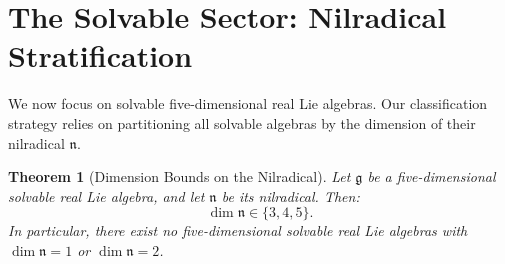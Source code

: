 \documentclass[11pt,a4paper]{article}
\newtheorem{theorem}{Theorem}[section]
\theoremstyle{definition}
\theoremstyle{remark}
\newcommand{\g}{\mathfrak{g}}
\newcommand{\n}{\mathfrak{n}}
\begin{document}
\section{The Solvable Sector: Nilradical Stratification}\label{sec:nilrad}

We now focus on solvable five-dimensional real Lie algebras. Our classification strategy relies on partitioning all solvable algebras by the dimension of their nilradical $\n$.

\begin{theorem}[Dimension Bounds on the Nilradical]\label{thm:nilrad_bounds}
Let $\g$ be a five-dimensional solvable real Lie algebra, and let $\n$ be its nilradical. Then:
\begin{equation}
    \dim \n \in \{3, 4, 5\}.
\end{equation}
In particular, there exist no five-dimensional solvable real Lie algebras with $\dim \n = 1$ or $\dim \n = 2$.
\end{theorem}
\end{document}
